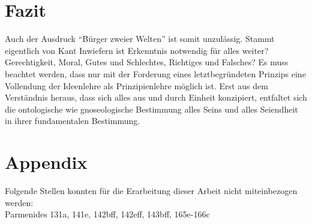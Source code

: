 \documentclass[12pt]{article}
\newcommand*{\zitatblock}[1]{%
    \begin{quote}
    \fontsize{10}{12}\selectfont
    \setlength{\parskip}{1.0em}
    #1
    \end{quote}
}
\begin{document}
\section{Fazit}
Auch der Ausdruck \enquote{Bürger zweier Welten} ist somit unzulässig. Stammt eigentlich von Kant
Inwiefern ist Erkenntnis notwendig für alles weiter? Gerechtigkeit, Moral, Gutes und Schlechtes, Richtiges und Falsches? 
Es muss beachtet werden, dass nur mit der Forderung eines letztbegründeten Prinzips eine Vollendung der Ideenlehre als Prinzipienlehre möglich ist. Erst aus dem Verständnis heraus, dass sich alles aus und durch Einheit konzipiert, entfaltet sich die ontologische wie gnoseologische Bestimmung alles Seins und alles Seiendheit in ihrer fundamentalen Bestimmung. 
\newpage
\nocite{politeia}
\section{Appendix}
Folgende Stellen konnten für die Erarbeitung dieser Arbeit nicht miteinbezogen werden:\\
Parmenides 131a, 141e, 142bff, 142eff, 143bff, 165e-166c\\
\end{document}
